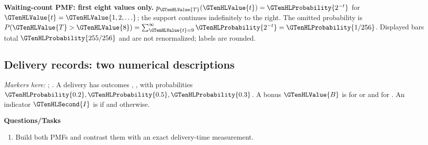 \par\noindent \begin{minipage}[t]{.98\linewidth}
\centering
{}
\par\small \textbf{Waiting-count PMF: first eight values only.} $p_{\GTenHLValue{T}}(\GTenHLValue{t})=\GTenHLProbability{2^{-t}}$ for $\GTenHLValue{t}=\GTenHLValue{1,2,\ldots}$; the support continues indefinitely to the right. The omitted probability is $P(\GTenHLValue{T}>\GTenHLValue{8})=\sum_{\GTenHLValue{t}=9}^{\infty}\GTenHLProbability{2^{-t}}=\GTenHLProbability{1/256}$. Displayed bars total $\GTenHLProbability{255/256}$ and are not renormalized; labels are rounded.
\end{minipage}\par\medskip

\subsection{Delivery records: two numerical descriptions}
\label{subsec:t2-c1-delivery-records-two-numerical-descriptions}
\textit{Markers here:} ; .
A delivery has outcomes , ,  with probabilities $\GTenHLProbability{0.2},\GTenHLProbability{0.5},\GTenHLProbability{0.3}$. A bonus $\GTenHLValue{B}$ is  for  or  and  for . An indicator $\GTenHLSecond{I}$ is  if  and  otherwise.

\textbf{Questions/Tasks}
\begin{enumerate}
\item Build both PMFs and contrast them with an exact delivery-time measurement.
\end{enumerate}
